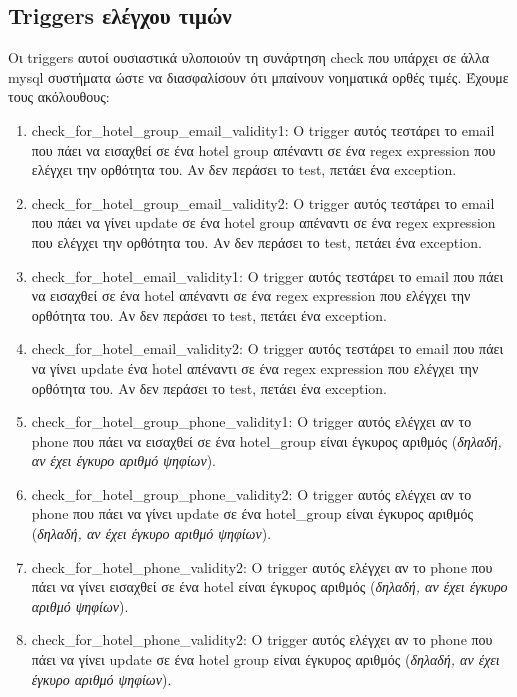 \documentclass[a4paper,oneside, 11pt]{article}
\begin{document}
\subsection{Triggers ελέγχου τιμών}
Οι triggers αυτοί ουσιαστικά υλοποιούν τη συνάρτηση check που υπάρχει σε άλλα mysql συστήματα ώστε να διασφαλίσουν ότι μπαίνουν νοηματικά ορθές τιμές. Έχουμε τους ακόλουθους:
\begin{enumerate}
\item check\_for\_hotel\_group\_email\_validity1: Ο trigger αυτός τεστάρει το email που πάει να εισαχθεί σε ένα hotel group απέναντι σε ένα regex expression που ελέγχει την ορθότητα του. Αν δεν περάσει το test, πετάει ένα exception.


\item check\_for\_hotel\_group\_email\_validity2: Ο trigger αυτός τεστάρει το email που πάει να γίνει update σε ένα hotel group απέναντι σε ένα regex expression που ελέγχει την ορθότητα του. Αν δεν περάσει το test, πετάει ένα exception.

\item check\_for\_hotel\_email\_validity1: Ο trigger αυτός τεστάρει το email που πάει να εισαχθεί σε ένα hotel απέναντι σε ένα regex expression που ελέγχει την ορθότητα του. Αν δεν περάσει το test, πετάει ένα exception.

\item check\_for\_hotel\_email\_validity2: Ο trigger αυτός τεστάρει το email που πάει να γίνει update ένα hotel απέναντι σε ένα regex expression που ελέγχει την ορθότητα του. Αν δεν περάσει το test, πετάει ένα exception.

\item check\_for\_hotel\_group\_phone\_validity1: Ο trigger αυτός ελέγχει αν το phone που πάει να εισαχθεί σε ένα hotel\_group είναι έγκυρος αριθμός (\textit{δηλαδή, αν έχει έγκυρο αριθμό ψηφίων}).


\item check\_for\_hotel\_group\_phone\_validity2: Ο trigger αυτός ελέγχει αν το phone που πάει να γίνει update σε ένα hotel\_group είναι έγκυρος αριθμός (\textit{δηλαδή, αν έχει έγκυρο αριθμό ψηφίων}).



\item check\_for\_hotel\_phone\_validity2: Ο trigger αυτός ελέγχει αν το phone που πάει να γίνει εισαχθεί σε ένα hotel είναι έγκυρος αριθμός (\textit{δηλαδή, αν έχει έγκυρο αριθμό ψηφίων}).

\item check\_for\_hotel\_phone\_validity2: Ο trigger αυτός ελέγχει αν το phone που πάει να γίνει update σε ένα hotel group είναι έγκυρος αριθμός (\textit{δηλαδή, αν έχει έγκυρο αριθμό ψηφίων}).



\end{enumerate}
\end{document}
